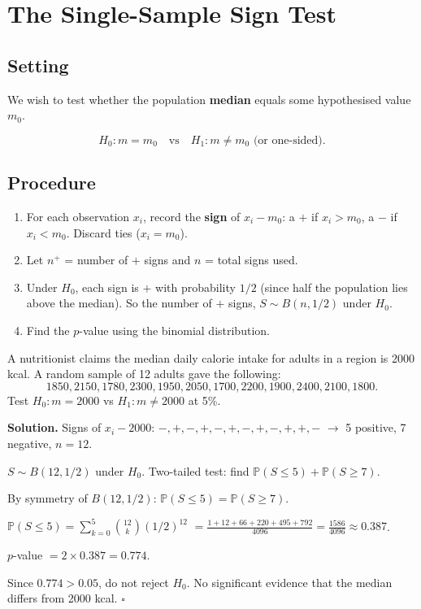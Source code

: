 \documentclass[12pt, a4paper, oneside]{book}
\theoremstyle{definition}
\theoremstyle{plain}
\theoremstyle{remark}
\newcommand{\Prob}{\mathbb{P}}
\newenvironment{solution}
  {\par\medskip\noindent\textbf{Solution.}\quad}
  {\hfill$\square$\par\medskip}
\begin{document}
\section{The Single-Sample Sign Test}
\label{sec:sign-single}

\subsection{Setting}

We wish to test whether the population \textbf{median} equals some
hypothesised value $m_0$.

\[
  H_0: m = m_0 \quad\text{vs}\quad H_1: m \ne m_0 \text{ (or one-sided)}.
\]

\subsection{Procedure}

\begin{enumerate}[label=\textbf{Step \arabic*:}]
  \item For each observation $x_i$, record the \textbf{sign} of $x_i - m_0$:
        a $+$ if $x_i > m_0$, a $-$ if $x_i < m_0$.  Discard ties ($x_i=m_0$).
  \item Let $n^+$ = number of $+$ signs and $n$ = total signs used.
  \item Under $H_0$, each sign is $+$ with probability $1/2$ (since half the
        population lies above the median).  So the number of $+$ signs,
        $S\sim B(n,1/2)$ under $H_0$.
  \item Find the $p$-value using the binomial distribution.
\end{enumerate}

\begin{workedexample}
A nutritionist claims the median daily calorie intake for adults in a region
is 2000 kcal.  A random sample of 12 adults gave the following:
\[
  1850, 2150, 1780, 2300, 1950, 2050, 1700, 2200, 1900, 2400, 2100, 1800.
\]
Test $H_0: m=2000$ vs $H_1: m\ne2000$ at 5\%.

\begin{solution}
Signs of $x_i - 2000$:
$-,+,-,+,-,+,-,+,-,+,+,-$ $\longrightarrow$ 5 positive, 7 negative, $n=12$.

$S \sim B(12, 1/2)$ under $H_0$.  Two-tailed test: find
$\Prob(S\le5)+\Prob(S\ge7)$.

By symmetry of $B(12,1/2)$:
$\Prob(S\le5)=\Prob(S\ge7)$.

$\Prob(S\le5) = \sum_{k=0}^5\binom{12}{k}(1/2)^{12}$
$=\frac{1+12+66+220+495+792}{4096}=\frac{1586}{4096}\approx0.387$.

$p$-value $= 2\times0.387=0.774$.

Since $0.774>0.05$, do not reject $H_0$.  No significant evidence that the
median differs from 2000 kcal.
\end{solution}
\end{workedexample}
\end{document}
